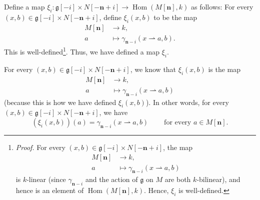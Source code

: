\documentclass[etingof-lie.tex]{subfiles}
\begin{document}
\begin{noncompile}
Define a map $\xi_{i}:\mathfrak{g}\left[  -i\right]  \times N\left[
-\mathbf{n}+i\right]  \rightarrow\operatorname*{Hom}\left(  M\left[
\mathbf{n}\right]  ,k\right)  $ as follows: For every $\left(  x,b\right)
\in\mathfrak{g}\left[  -i\right]  \times N\left[  -\mathbf{n}+i\right]  $,
define $\xi_{i}\left(  x,b\right)  $ to be the map%
\begin{align*}
M\left[  \mathbf{n}\right]   &  \rightarrow k,\\
a  &  \mapsto\gamma_{\mathbf{n}-i}\left(  x\rightharpoonup a,b\right)  .
\end{align*}
This is well-defined\footnote{\textit{Proof.} For every $\left(  x,b\right)
\in\mathfrak{g}\left[  -i\right]  \times N\left[  -\mathbf{n}+i\right]  $, the
map%
\begin{align*}
M\left[  \mathbf{n}\right]   &  \rightarrow k,\\
a  &  \mapsto\gamma_{\mathbf{n}-i}\left(  x\rightharpoonup a,b\right)
\end{align*}
is $k$-linear (since $\gamma_{\mathbf{n}-i}$ and the action of $\mathfrak{g}$
on $M$ are both $k$-bilinear), and hence is an element of $\operatorname*{Hom}%
\left(  M\left[  \mathbf{n}\right]  ,k\right)  $. Hence, $\xi_{i}$ is
well-defined.}. Thus, we have defined a map $\xi_{i}$.

For every $\left(  x,b\right)  \in\mathfrak{g}\left[  -i\right]  \times
N\left[  -\mathbf{n}+i\right]  $, we know that $\xi_{i}\left(  x,b\right)  $
is the map%
\begin{align*}
M\left[  \mathbf{n}\right]   &  \rightarrow k,\\
a  &  \mapsto\gamma_{\mathbf{n}-i}\left(  x\rightharpoonup a,b\right)
\end{align*}
(because this is how we have defined $\xi_{i}\left(  x,b\right)  $). In other
words, for every $\left(  x,b\right)  \in\mathfrak{g}\left[  -i\right]  \times
N\left[  -\mathbf{n}+i\right]  $, we have%
\begin{equation}
\left(  \xi_{i}\left(  x,b\right)  \right)  \left(  a\right)  =\gamma
_{\mathbf{n}-i}\left(  x\rightharpoonup a,b\right)
\ \ \ \ \ \ \ \ \ \ \text{for every }a\in M\left[  \mathbf{n}\right]  .
\label{pf.bilext.1.xi_i}%
\end{equation}



\end{noncompile}
\end{document}
